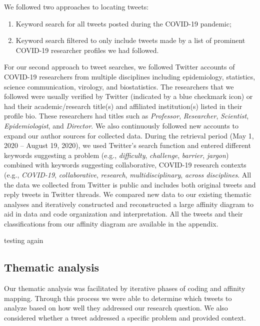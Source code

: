 \documentclass[acmsmall,authordraft]{acmart}
\begin{document}
We followed two approaches to locating tweets: 
\begin{enumerate}
    \item Keyword search for all tweets posted during the COVID-19 pandemic;
    \item Keyword search filtered to only include tweets made by a list of prominent COVID-19 researcher profiles we had followed.
\end{enumerate}    
    
For our second approach to tweet searches, we followed Twitter accounts of COVID-19 researchers from multiple disciplines including epidemiology, statistics, science communication, virology, and biostatistics. The researchers that we followed were usually verified by Twitter (indicated by a blue checkmark icon) or had their academic/research title(s) and affiliated institution(s) listed in their profile bio. These researchers had titles such as \textit{Professor}, \textit{Researcher}, \textit{Scientist}, \textit{Epidemiologist}, and \textit{Director}. We also continuously followed new accounts to expand our author sources for collected data. 
During the retrieval period (May 1, 2020 – August 19, 2020), we used Twitter's search function and entered different keywords suggesting a problem (e.g., \textit{difficulty}, \textit{challenge}, \textit{barrier}, \textit{jargon}) combined with keywords suggesting collaborative, COVID-19 research contexts (e.g., \textit{COVID-19},  \textit{collaborative}, \textit{research}, \textit{multidisciplinary}, \textit{across disciplines}. All the data we collected from Twitter is public and includes both original tweets and reply tweets in Twitter threads. We compared new data to our existing thematic analyses and iteratively constructed and reconstructed a large affinity diagram to aid in data and code organization and interpretation. All the tweets and their classifications from our affinity diagram are available in the appendix.

testing again

\subsection{Thematic analysis}
\label{Thematic analysis}
Our thematic analysis was facilitated by iterative phases of coding and affinity mapping. Through this process we were able to determine which tweets to analyze based on how well they addressed our research question. We also considered whether a tweet addressed a specific problem and provided context.
\end{document}
